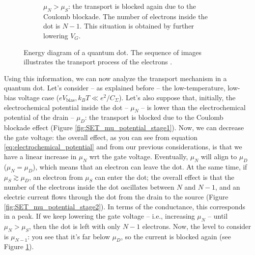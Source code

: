 \begin{figure}
\begin{subfigure}[t]{0.45\textwidth}
		\caption{$\mu_N>\mu_S$: the transport is blocked again due to the Coulomb blockade. The number of electrons inside the dot is $N-1$. This situation is obtained by further lowering $V_G$.}
		\label{fig:SET_mu_potential_stage3}
		\end{subfigure}
	\caption{Energy diagram of a quantum dot. The sequence of images illustrates the transport process of the electrons \citep[adapted from][]{Fasth2007}.}
	\label{fig:SET_mu_potential}
\end{figure}

Using this information, we can now analyze the transport mechanism in a quantum dot. Let's consider -- as explained before -- the low-temperature, low-bias voltage case ($eV_{\text{bias}},k_BT \ll e^2/C_{\Sigma}$). Let's also suppose that, initially, the electrochemical potential inside the dot -- $\mu_N$ -- is lower than the electrochemical potential of the drain -- $\mu_D$: the transport is blocked due to the Coulomb blockade effect (Figure \ref{fig:SET_mu_potential_stage1}). Now, we can decrease the gate voltage: the overall effect, as you can see from equation \eqref{eq:electrochemical_potential} and from our previous considerations, is that we have a linear increase in $\mu_N$ wrt the gate voltage. Eventually, $\mu_N$ will align to $\mu_D$ ($\mu_N = \mu_D$), which means that an electron can leave the dot. At the same time, if $\mu_S \gtrsim \mu_D$, an electron from $\mu_S$ can enter the dot; the overall effect is that the number of the electrons inside the dot oscillates between $N$ and $N-1$, and an electric current flows through the dot from the drain to the source (Figure \ref{fig:SET_mu_potential_stage2}). In terms of the conductance, this corresponds in a peak. If we keep lowering the gate voltage -- i.e., increasing $\mu_N$ -- until $\mu_N > \mu_S$, then the dot is left with only $N-1$ electrons. Now, the level to consider is $\mu_{N-1}$: you see that it's far below $\mu_D$, so the current is blocked again (see Figure \ref{fig:SET_mu_potential_stage3}).

